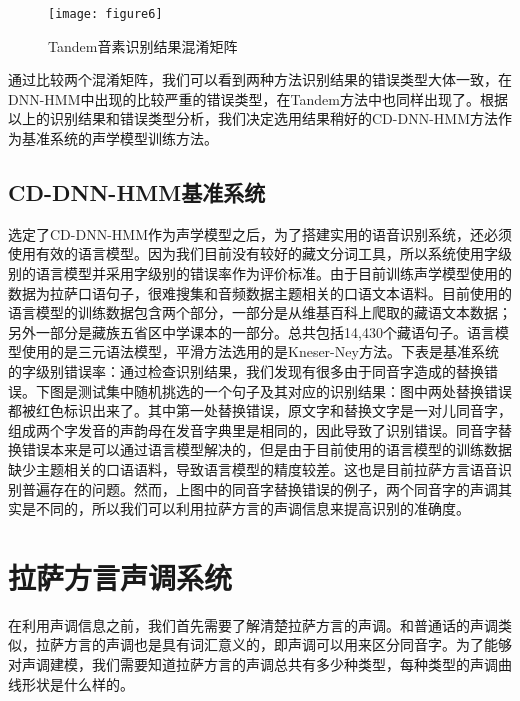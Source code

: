 \begin{figure}[htbp]
\centering
\texttt{[image: figure6]}
\caption{Tandem音素识别结果混淆矩阵}\label{fig:figure6}
\vspace{\baselineskip}
\end{figure}

{\color{red}{补充期刊论文图3a,3b}}通过比较两个混淆矩阵，我们可以看到两种方法识别结果的错误类型大体一致，在DNN-HMM中出现的比较严重的错误类型，在Tandem方法中也同样出现了。根据以上的识别结果和错误类型分析，我们决定选用结果稍好的CD-DNN-HMM方法作为基准系统的声学模型训练方法。
\subsection{CD-DNN-HMM基准系统}
选定了CD-DNN-HMM作为声学模型之后，为了搭建实用的语音识别系统，还必须使用有效的语言模型。因为我们目前没有较好的藏文分词工具，所以系统使用字级别的语言模型并采用字级别的错误率作为评价标准。由于目前训练声学模型使用的数据为拉萨口语句子，很难搜集和音频数据主题相关的口语文本语料。目前使用的语言模型的训练数据包含两个部分，一部分是从维基百科上爬取的藏语文本数据；另外一部分是藏族五省区中学课本的一部分。总共包括14,430个藏语句子。语言模型使用的是三元语法模型，平滑方法选用的是Kneser-Ney方法。下表是基准系统的字级别错误率：{\color{red}{补充期刊论文表3}}通过检查识别结果，我们发现有很多由于同音字造成的替换错误。下图是测试集中随机挑选的一个句子及其对应的识别结果：{\color{red}{补充期刊论文图4}}图中两处替换错误都被红色标识出来了。其中第一处替换错误，原文字和替换文字是一对儿同音字，组成两个字发音的声韵母在发音字典里是相同的，因此导致了识别错误。同音字替换错误本来是可以通过语言模型解决的，但是由于目前使用的语言模型的训练数据缺少主题相关的口语语料，导致语言模型的精度较差。这也是目前拉萨方言语音识别普遍存在的问题。然而，上图中的同音字替换错误的例子，两个同音字的声调其实是不同的，所以我们可以利用拉萨方言的声调信息来提高识别的准确度。
\section{拉萨方言声调系统}
在利用声调信息之前，我们首先需要了解清楚拉萨方言的声调。和普通话的声调类似，拉萨方言的声调也是具有词汇意义的，即声调可以用来区分同音字。为了能够对声调建模，我们需要知道拉萨方言的声调总共有多少种类型，每种类型的声调曲线形状是什么样的。
